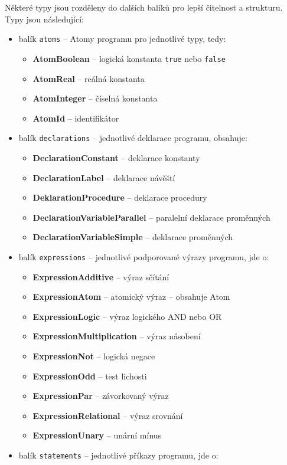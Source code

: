 \documentclass[
12pt,
a4paper,
pdftex,
czech,
titlepage
]{report}
\begin{document}
Některé typy jsou rozděleny do dalších balíků pro lepší čitelnost a strukturu.
Typy jsou následující:
\begin{itemize}
\item balík \texttt{atoms} -- Atomy programu pro jednotlivé typy, tedy:
	\begin{itemize}
 	\item \textbf{AtomBoolean} -- logická konstanta \texttt{true} nebo \texttt{false}
 	\item \textbf{AtomReal} -- reálná konstanta
 	\item \textbf{AtomInteger} -- číselná konstanta
 	\item \textbf{AtomId} -- identifikátor
 	\end{itemize}
\item balík \texttt{declarations} -- jednotlivé deklarace programu, obsahuje:
	\begin{itemize}
	\item \textbf{DeclarationConstant} -- deklarace konstanty
	\item \textbf{DeclarationLabel} -- deklarace návěští
	\item \textbf{DeklarationProcedure} -- deklarace procedury
	\item \textbf{DeclarationVariableParallel} -- paralelní deklarace proměnných
	\item \textbf{DeclarationVariableSimple} -- deklarace proměnných
	\end{itemize}	
\item balík \texttt{expressions} -- jednotlivé podporované výrazy programu, jde o:
	\begin{itemize}
	\item \textbf{ExpressionAdditive} -- výraz sčítání
	\item \textbf{ExpressionAtom} -- atomický výraz -- obsahuje Atom
	\item \textbf{ExpressionLogic} -- výraz logického AND nebo OR
	\item \textbf{ExpressionMultiplication} -- výraz násobení
	\item \textbf{ExpressionNot} -- logická negace
	\item \textbf{ExpressionOdd} -- test lichosti
	\item \textbf{ExpressionPar} -- závorkovaný výraz
	\item \textbf{ExpressionRelational} -- výraz srovnání
	\item \textbf{ExpressionUnary} -- unární mínus
	\end{itemize}
\item balík \texttt{statements} -- jednotlivé příkazy programu, jde o:

\end{itemize}
\end{document}
